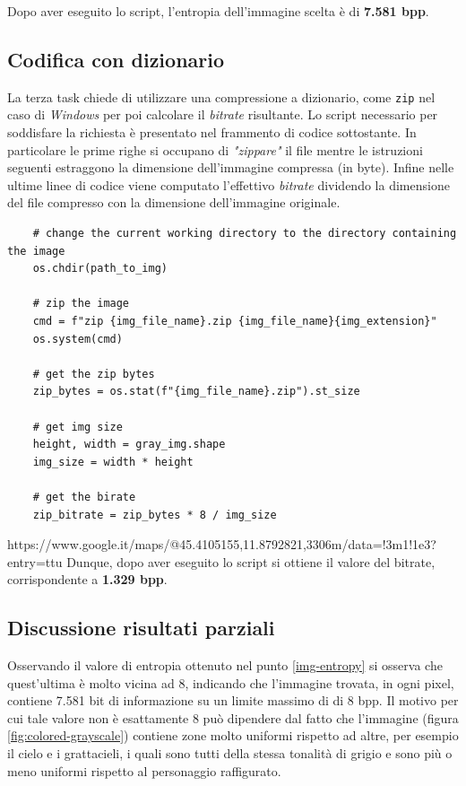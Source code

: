\noindent Dopo aver eseguito lo script, l'entropia dell'immagine scelta è di \textbf{7.581 bpp}.



\vspace{15px}\subsection{Codifica con dizionario} \label{dictionary-coding}
La terza task chiede di utilizzare una compressione a dizionario, come \texttt{zip} nel caso di \textsl{Windows} per poi calcolare il \textsl{bitrate} risultante. Lo script necessario per soddisfare la richiesta è presentato nel frammento di codice sottostante. In particolare le prime righe si occupano di \textsl{"zippare"} il file mentre le istruzioni seguenti estraggono la dimensione dell'immagine compressa (in byte). Infine nelle ultime linee di codice viene computato l'effettivo \textsl{bitrate} dividendo la dimensione del file compresso con la dimensione dell'immagine originale.

\begin{lstlisting}
    # change the current working directory to the directory containing the image
    os.chdir(path_to_img)

    # zip the image
    cmd = f"zip {img_file_name}.zip {img_file_name}{img_extension}"
    os.system(cmd)
    
    # get the zip bytes
    zip_bytes = os.stat(f"{img_file_name}.zip").st_size

    # get img size
    height, width = gray_img.shape
    img_size = width * height

    # get the birate
    zip_bitrate = zip_bytes * 8 / img_size 
\end{lstlisting}
https://www.google.it/maps/@45.4105155,11.8792821,3306m/data=!3m1!1e3?entry=ttu
\noindent Dunque, dopo aver eseguito lo script si ottiene il valore del bitrate, corrispondente a \textbf{1.329 bpp}. 



\vspace{15px}\subsection{Discussione risultati parziali}
Osservando il valore di entropia ottenuto nel punto \ref{img-entropy} si osserva che quest'ultima è molto vicina ad 8, indicando che l'immagine trovata, in ogni pixel, contiene 7.581 bit di informazione su un limite massimo di di 8 bpp. Il motivo per cui tale valore non è esattamente 8 può dipendere dal fatto che l'immagine (figura \ref{fig:colored-grayscale}) contiene zone molto uniformi rispetto ad altre, per esempio il cielo e i grattacieli, i quali sono tutti della stessa tonalità di grigio e sono più o meno uniformi rispetto al personaggio raffigurato.

